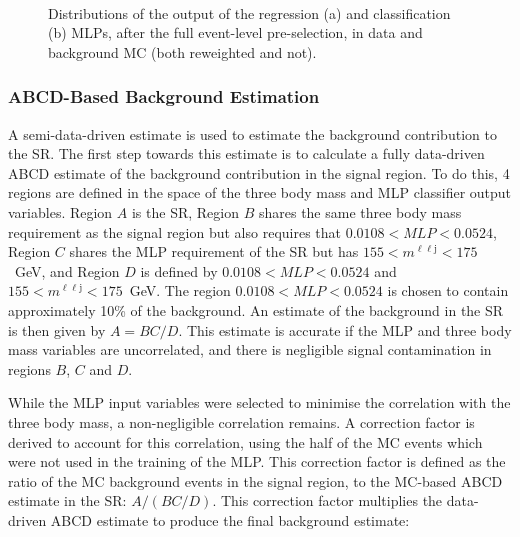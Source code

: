 \documentclass[NOTE, atlasdraft=true, texlive=2017, UKenglish]{\ATLASLATEXPATH atlasdoc}
\begin{document}
\begin{figure}[!htbp]
  \centering
  \\
  \caption{Distributions of the output of the regression (a) and classification (b) MLPs, after the full event-level pre-selection, in data and background MC (both reweighted and not).}
  \label{fig:rwmlpoutputs}
\end{figure}


\subsubsection{ABCD-Based Background Estimation}
\label{sec:bkgdest}

A semi-data-driven estimate is used to estimate the background contribution to the SR. The first step towards this estimate is to calculate a fully data-driven ABCD estimate of the background contribution in the signal region. To do this, 4 regions are defined in the space of the three body mass and MLP classifier output variables. Region $A$ is the SR, Region $B$ shares the same three body mass requirement as the signal region but also requires that $0.0108<MLP<0.0524$, Region $C$ shares the MLP requirement of the SR but has $155 < m^{\ell\ell\text{j}} < 175$~GeV, and Region $D$ is defined by $0.0108<MLP<0.0524$ and $155 < m^{\ell\ell\text{j}} < 175$~GeV. The region $0.0108<MLP<0.0524$ is chosen to contain approximately 10\% of the background. An estimate of the background in the SR is then given by $A=BC/D$. This estimate is accurate if the MLP and three body mass variables are uncorrelated, and there is negligible signal contamination in regions $B$, $C$ and $D$.%

While the MLP input variables were selected to minimise the correlation with the three body mass, a non-negligible correlation remains. A correction factor is derived to account for this correlation, using the half of the MC events which were not used in the training of the MLP. This correction factor is defined as the ratio of the MC background events in the signal region, to the MC-based ABCD estimate in the SR: $A/(BC/D)$. This correction factor multiplies the data-driven ABCD estimate to produce the final background estimate:
\end{document}
